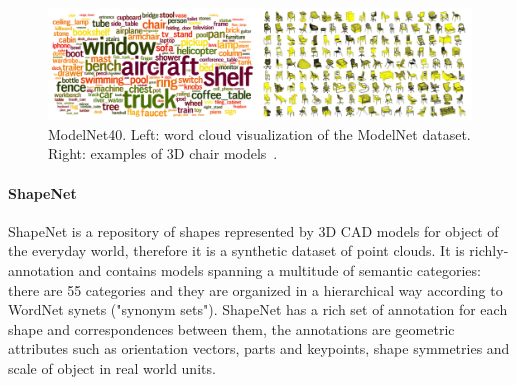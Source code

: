 \begin{figure}[ht]
    \centering
    \includegraphics[width=1\textwidth]{images/modelnet.png}
    \caption{ModelNet40. Left: word cloud visualization of the ModelNet dataset. Right: examples of 3D chair models~\cite{ShapeNets}.}
    \label{fig:modelnet}
\end{figure}

\paragraph{ShapeNet~\cite{chang2015shapenet}}

ShapeNet is a repository of shapes represented by 3D CAD models for object of the everyday world, therefore it is a synthetic dataset of point clouds. It is richly-annotation and contains models spanning a multitude of semantic categories: there are 55 categories and they are organized in a hierarchical way according to WordNet synets ("synonym sets"). ShapeNet has a rich set of annotation for each shape and correspondences between them, the annotations are geometric attributes such as orientation vectors, parts and keypoints, shape symmetries and scale of object in real world units.




